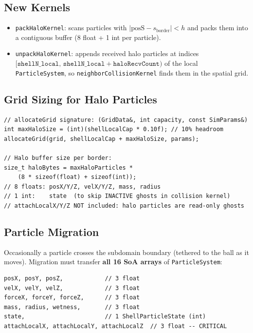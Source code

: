 \documentclass[conference]{IEEEtran}
\begin{document}
\subsection{New Kernels}

\begin{itemize}
  \item \texttt{packHaloKernel}: scans particles with
        $|\text{posS} - s_\text{border}| < h$ and packs them into a
        contiguous buffer (8 float + 1 int per particle).
  \item \texttt{unpackHaloKernel}: appends received halo particles at
        indices $[\texttt{shellN\_local},\,\texttt{shellN\_local} +
        \texttt{haloRecvCount})$ of the local \texttt{ParticleSystem}, so
        \texttt{neighborCollisionKernel} finds them in the spatial grid.
\end{itemize}

\subsection{Grid Sizing for Halo Particles}

\begin{lstlisting}
// allocateGrid signature: (GridData&, int capacity, const SimParams&)
int maxHaloSize = (int)(shellLocalCap * 0.10f); // 10% headroom
allocateGrid(grid, shellLocalCap + maxHaloSize, params);

// Halo buffer size per border:
size_t haloBytes = maxHaloParticles *
    (8 * sizeof(float) + sizeof(int));
// 8 floats: posX/Y/Z, velX/Y/Z, mass, radius
// 1 int:    state  (to skip INACTIVE ghosts in collision kernel)
// attachLocalX/Y/Z NOT included: halo particles are read-only ghosts
\end{lstlisting}

\subsection{Particle Migration}

Occasionally a particle crosses the subdomain boundary (tethered to the ball
as it moves). Migration must transfer \textbf{all 16 SoA arrays} of
\texttt{ParticleSystem}:

\begin{lstlisting}[numbers=none]
posX, posY, posZ,            // 3 float
velX, velY, velZ,            // 3 float
forceX, forceY, forceZ,      // 3 float
mass, radius, wetness,       // 3 float
state,                       // 1 ShellParticleState (int)
attachLocalX, attachLocalY, attachLocalZ  // 3 float -- CRITICAL
\end{lstlisting}
\end{document}
